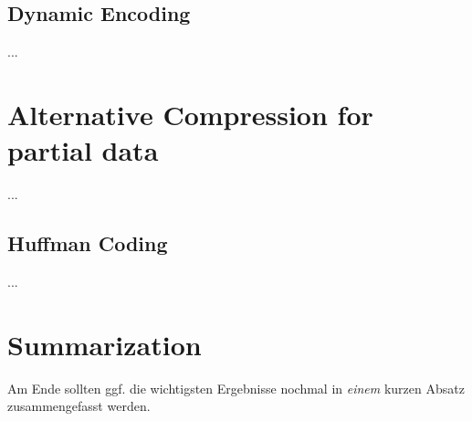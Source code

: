 \subsection{Dynamic Encoding}
...

\section{Alternative Compression for partial data}
\label{ch:Conceptual Design:sec:Alternative Encoding}
...
\subsection{Huffman Coding}
...
\section{Summarization}
\label{ch:Conceptual Design:sec:Summarization}

Am Ende sollten ggf. die wichtigsten Ergebnisse nochmal in \emph{einem}
kurzen Absatz zusammengefasst werden.

